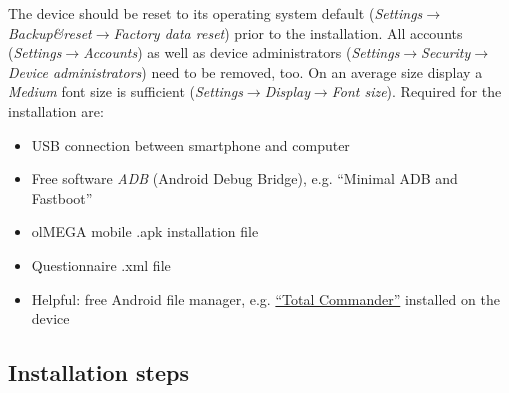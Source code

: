 \documentclass[11pt,a4paper,titlepage]{article}
\newcommand\ClrSquare[1]{\textcolor{#1}{\rule{7pt}{7pt}}}
\begin{document}
The device should be reset to its operating system default (\textit{Settings}$\rightarrow$\textit{Backup\&reset}$\rightarrow$\textit{Factory data reset}) prior to the installation. All accounts (\textit{Settings}$\rightarrow$\textit{Accounts}) as well as device administrators (\textit{Settings}$\rightarrow$\textit{Security}$\rightarrow$\textit{Device administrators}) need to be removed, too. On an average size display a \textit{Medium} font size is sufficient (\textit{Settings}$\rightarrow$\textit{Display}$\rightarrow$\textit{Font size}). Required for the installation are:

\begin{itemize}[label=\ClrSquare{jadeRed}]
	\item USB connection between smartphone and computer
	\item Free software \textit{ADB} (Android Debug Bridge), e.g. ``Minimal ADB and Fastboot''
	\item olMEGA mobile .apk installation file
	\item Questionnaire .xml file
	\item Helpful: free Android file manager, e.g. \href{https://total-commander.de.uptodown.com/android}{``Total Commander''} installed on the device
\end{itemize}


\subsection{Installation steps}\label{sub:installation}
\end{document}
